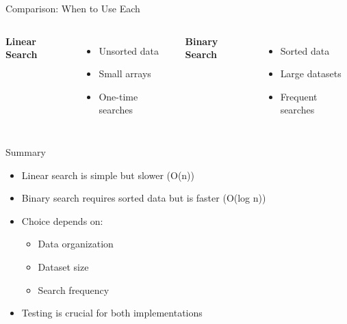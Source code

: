 \documentclass{beamer}
\begin{document}
\begin{frame}{Comparison: When to Use Each}
\begin{columns}
\textbf{Linear Search}
\begin{itemize}
\item Unsorted data
\item Small arrays
\item One-time searches
\end{itemize}

\pause

\textbf{Binary Search}
\begin{itemize}
\item Sorted data
\item Large datasets
\item Frequent searches
\end{itemize}
\end{columns}
\end{frame}

\begin{frame}{Summary}
\begin{itemize}
\item Linear search is simple but slower (O(n))
\item Binary search requires sorted data but is faster (O(log n))
\item Choice depends on:
  \begin{itemize}
  \item Data organization
  \item Dataset size
  \item Search frequency
  \end{itemize}
\item Testing is crucial for both implementations
\end{itemize}
\end{frame}
\end{document}
